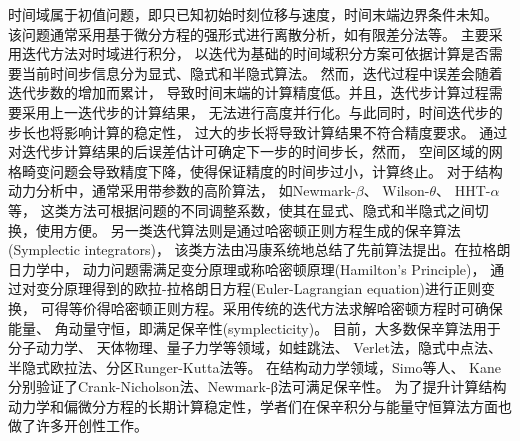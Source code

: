时间域属于初值问题，即只已知初始时刻位移与速度，时间末端边界条件未知。
该问题通常采用基于微分方程的强形式进行离散分析，如有限差分法等\cite{hughes2000finite}。
主要采用迭代方法对时域进行积分，
以迭代为基础的时间域积分方案可依据计算是否需要当前时间步信息分为显式、隐式和半隐式算法\cite{SBDAC}。
然而，迭代过程中误差会随着迭代步数的增加而累计，
导致时间末端的计算精度低。并且，迭代步计算过程需要采用上一迭代步的计算结果，
无法进行高度并行化。与此同时，时间迭代步的步长也将影响计算的稳定性\cite{JING2024106027}，
过大的步长将导致计算结果不符合精度要求。
通过对迭代步计算结果的后误差估计\cite{558658}可确定下一步的时间步长，然而，
空间区域的网格畸变问题会导致精度下降，使得保证精度的时间步过小，计算终止。
对于结构动力分析中，通常采用带参数的高阶算法，
如Newmark-$\beta$\cite{zhangOptimalImplicitSinglestep2024}、
Wilson-$\theta$\cite{zhang2023}、
HHT-$\alpha$\cite{10.1115/1.2900803}等，
这类方法可根据问题的不同调整系数，使其在显式、隐式和半隐式之间切换，使用方便。
另一类迭代算法则是通过哈密顿正则方程生成的保辛算法(Symplectic integrators)\cite{kang2015symplectic}，
该类方法由冯康系统地总结了先前算法提出\cite{Feng2010}。在拉格朗日力学中，
动力问题需满足变分原理或称哈密顿原理(Hamilton's Principle)，
通过对变分原理得到的欧拉-拉格朗日方程(Euler-Lagrangian equation)进行正则变换，
可得等价得哈密顿正则方程。采用传统的迭代方法求解哈密顿方程时可确保能量、
角动量守恒，即满足保辛性(symplecticity)\cite{YOSHIDA1990262}。
目前，大多数保辛算法用于分子动力学、
天体物理、量子力学等领域\cite{qiu2023baoxin}，如蛙跳法\cite{smith2005application}、
Verlet法\cite{brown2004verlet}，隐式中点法\cite{martin2006implicit}、
半隐式欧拉法\cite{green2007semi}、分区Runger-Kutta法\cite{91930e04}等。
在结构动力学领域，Simo等人\cite{SIMO199263}、
Kane\cite{kane1999symplectic}分别验证了Crank-Nicholson法、Newmark-β法可满足保辛性。
为了提升计算结构动力学和偏微分方程的长期计算稳定性，学者们在保辛积分与能量守恒算法方面也做了许多开创性工作\cite{antiaNumericalMethodsScientists2012,bou-rabeeHamiltonPontryaginIntegrators2009,diazEnergyConservingExplicit2009,fengSymplecticGeometricAlgorithms2010,hairerGeometricNumericalIntegration2006a,hollowayNumericalMethodsHamiltonian1996,borriDynamicResponseMechanical1985,borriBasicFeaturesTime1992,borriPrimalMixedForms1991,borriVariationalApproachesDynamics1990}。


